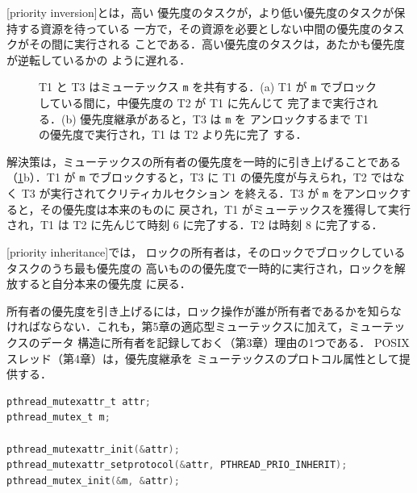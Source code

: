 \documentclass[../main.tex]{subfiles}
\begin{document}
\begin{definition}[優先度逆転]
  [priority inversion]とは，高い
  優先度のタスクが，より低い優先度のタスクが保持する資源を待っている
  一方で，その資源を必要としない中間の優先度のタスクがその間に実行される
  ことである．高い優先度のタスクは，あたかも優先度が逆転しているかの
  ように遅れる．
\end{definition}

\begin{figure}[htbp]
  \centering
  
  \caption{T1 と T3 はミューテックス \texttt{m} を共有する．(a) T1 が
    \texttt{m} でブロックしている間に，中優先度の T2 が T1 に先んじて
    完了まで実行される．(b) 優先度継承があると，T3 は \texttt{m} を
    アンロックするまで T1 の優先度で実行され，T1 は T2 より先に完了
    する．}
  \label{fig:l07-inversion}
\end{figure}

解決策は，ミューテックスの所有者の優先度を一時的に引き上げることである
（\cref{fig:l07-inversion}b）．T1 が \texttt{m} でブロックすると，T3 に
T1 の優先度が与えられ，T2 ではなく T3 が実行されてクリティカルセクション
を終える．T3 が \texttt{m} をアンロックすると，その優先度は本来のものに
戻され，T1 がミューテックスを獲得して実行され，T1 は T2 に先んじて時刻 6
に完了する．T2 は時刻 8 に完了する．

\begin{definition}[優先度継承]
  [priority inheritance]では，
  ロックの所有者は，そのロックでブロックしているタスクのうち最も優先度の
  高いものの優先度で一時的に実行され，ロックを解放すると自分本来の優先度
  に戻る．
\end{definition}

所有者の優先度を引き上げるには，ロック操作が誰が所有者であるかを知らな
ければならない．これも，第5章の適応型ミューテックスに加えて，ミューテックスのデータ
構造に所有者を記録しておく（第3章）理由の1つである．%
POSIX スレッド（第4章）は，優先度継承を
ミューテックスのプロトコル属性として提供する．
\begin{lstlisting}[language=C, numbers=none]
pthread_mutexattr_t attr;
pthread_mutex_t m;

pthread_mutexattr_init(&attr);
pthread_mutexattr_setprotocol(&attr, PTHREAD_PRIO_INHERIT);
pthread_mutex_init(&m, &attr);
\end{lstlisting}
\end{document}

